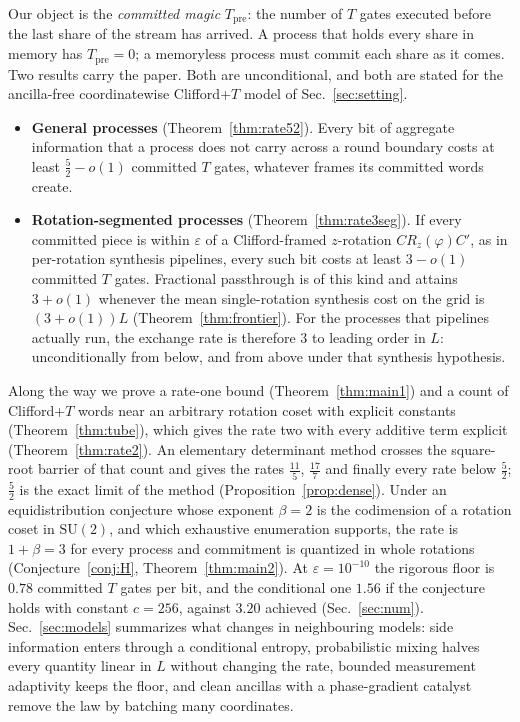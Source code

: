 \documentclass[aps,prx,twocolumn,superscriptaddress,nofootinbib,longbibliography]{revtex4-2}
\theoremstyle{plain}
\theoremstyle{definition}
\theoremstyle{remark}
\newcommand{\Tpre}{T_{\mathrm{pre}}}
\newcommand{\SU}{\mathrm{SU}(2)}
\begin{document}
Our object is the \emph{committed magic} $\Tpre$: the number of $T$ gates executed before the last share of the stream has arrived. A process that holds every share in memory has $\Tpre=0$; a memoryless process must commit each share as it comes. Two results carry the paper. Both are unconditional, and both are stated for the ancilla-free coordinatewise Clifford+$T$ model of Sec.~\ref{sec:setting}.
\begin{itemize}\setlength\itemsep{1pt}
\item \textbf{General processes} (Theorem~\ref{thm:rate52}). Every bit of aggregate information that a process does not carry across a round boundary costs at least $\tfrac52-o(1)$ committed $T$ gates, whatever frames its committed words create.
\item \textbf{Rotation-segmented processes} (Theorem~\ref{thm:rate3seg}). If every committed piece is within $\varepsilon$ of a Clifford-framed $z$-rotation $CR_z(\varphi)C'$, as in per-rotation synthesis pipelines, every such bit costs at least $3-o(1)$ committed $T$ gates. Fractional passthrough is of this kind and attains $3+o(1)$ whenever the mean single-rotation synthesis cost on the grid is $(3+o(1))L$ (Theorem~\ref{thm:frontier}). For the processes that pipelines actually run, the exchange rate is therefore $3$ to leading order in $L$: unconditionally from below, and from above under that synthesis hypothesis.
\end{itemize}
Along the way we prove a rate-one bound (Theorem~\ref{thm:main1}) and a count of Clifford+$T$ words near an arbitrary rotation coset with explicit constants (Theorem~\ref{thm:tube}), which gives the rate two with every additive term explicit (Theorem~\ref{thm:rate2}). An elementary determinant method crosses the square-root barrier of that count and gives the rates $\tfrac{11}5$, $\tfrac{17}7$ and finally every rate below $\tfrac52$; $\tfrac52$ is the exact limit of the method (Proposition~\ref{prop:dense}). Under an equidistribution conjecture whose exponent $\beta=2$ is the codimension of a rotation coset in $\SU$, and which exhaustive enumeration supports, the rate is $1+\beta=3$ for every process and commitment is quantized in whole rotations (Conjecture~\ref{conj:H}, Theorem~\ref{thm:main2}). At $\varepsilon=10^{-10}$ the rigorous floor is $0.78$ committed $T$ gates per bit, and the conditional one $1.56$ if the conjecture holds with constant $c=256$, against $3.20$ achieved (Sec.~\ref{sec:num}). Sec.~\ref{sec:models} summarizes what changes in neighbouring models: side information enters through a conditional entropy, probabilistic mixing halves every quantity linear in $L$ without changing the rate, bounded measurement adaptivity keeps the floor, and clean ancillas with a phase-gradient catalyst remove the law by batching many coordinates.
\end{document}
